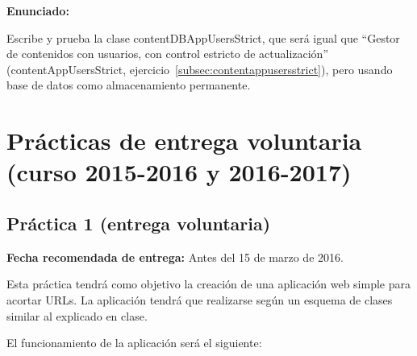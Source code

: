 \textbf{Enunciado:}

Escribe y prueba la clase contentDBAppUsersStrict, que será igual que ``Gestor de contenidos con usuarios, con control estricto de actualización'' (contentAppUsersStrict, ejercicio~\ref{subsec:contentappusersstrict}), pero usando base de datos como almacenamiento permanente.

\newpage

\section{Prácticas de entrega voluntaria (curso 2015-2016 y 2016-2017)}


\subsection{Práctica 1 (entrega voluntaria)}
\label{subsec:practica-vol-1-2016}

\textbf{Fecha recomendada de entrega:} Antes del 15 de marzo de 2016.

Esta práctica tendrá como objetivo la creación de una aplicación web simple para acortar URLs. La aplicación tendrá que realizarse según un esquema de clases similar al explicado en clase.

El funcionamiento de la aplicación será el siguiente:


